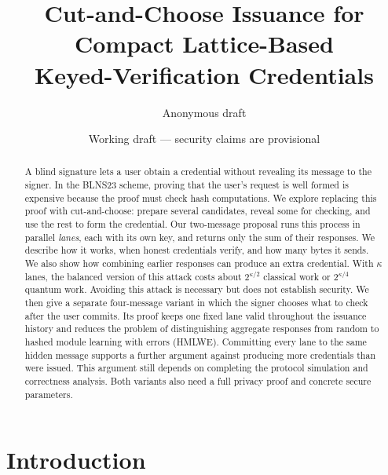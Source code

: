 \documentclass[10pt]{article}
\title{Cut-and-Choose Issuance for Compact Lattice-Based\\
Keyed-Verification Credentials}
\author{Anonymous draft}
\date{Working draft --- security claims are provisional}
\begin{document}
\maketitle

\begin{abstract}
A blind signature lets a user obtain a credential without revealing its
message to the signer.  In the BLNS23 scheme, proving that the user's request
is well formed is expensive because the proof must check hash computations.
We explore replacing this proof with cut-and-choose: prepare several
candidates, reveal some for checking, and use the rest to form the credential.
Our two-message proposal runs this process in parallel \emph{lanes}, each
with its own key, and returns only the sum of their responses.  We describe
how it works, when honest credentials verify, and how many bytes it sends.
We also show how combining earlier responses can produce an extra credential.
With $\kappa$ lanes, the balanced version of this attack costs about
$2^{\kappa/2}$ classical work or $2^{\kappa/4}$ quantum work.  Avoiding this
attack is necessary but does not establish security.  We then give a separate
four-message variant in which the signer chooses what to check after the
user commits.  Its proof keeps one fixed lane valid throughout the issuance
history and reduces the problem of distinguishing aggregate responses from
random to hashed module learning with errors (HMLWE).  Committing every lane
to the same hidden message supports a further argument against producing more
credentials than were issued.  This argument still depends on completing the
protocol simulation and correctness analysis.  Both variants also need a
full privacy proof and concrete secure parameters.
\end{abstract}

\begin{center}
\end{center}

\section{Introduction}
\end{document}
